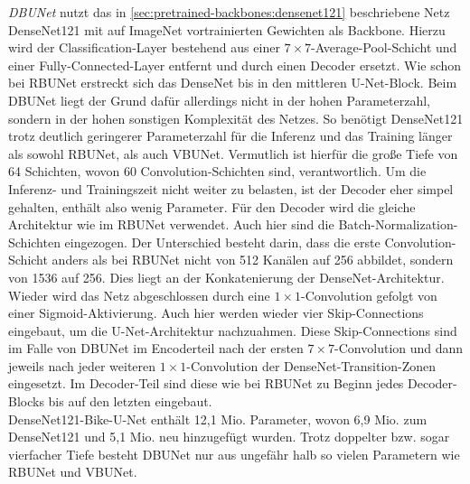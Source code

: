 \textit{\ac{DBUNet}} nutzt das in \autoref{sec:pretrained-backbones:densenet121} beschriebene Netz DenseNet121 
mit auf ImageNet vortrainierten Gewichten als Backbone.
Hierzu wird der Classification-Layer bestehend aus einer $7\times 7$-Average-Pool-Schicht 
und einer Fully-Connected-Layer entfernt und durch einen Decoder ersetzt. 
Wie schon bei \ac{RBUNet} erstreckt sich das DenseNet bis in den mittleren U-Net-Block. Beim \ac{DBUNet} 
liegt der Grund dafür allerdings nicht in der hohen Parameterzahl, sondern in der hohen sonstigen Komplexität 
des Netzes. So benötigt DenseNet121 trotz deutlich geringerer Parameterzahl für die Inferenz und das Training länger 
als sowohl \ac{RBUNet}, als auch \ac{VBUNet}. Vermutlich ist hierfür die große Tiefe von 64 Schichten, wovon 
60 Convolution-Schichten sind, verantwortlich. Um die Inferenz- und Trainingszeit nicht weiter zu belasten, 
ist der Decoder eher simpel gehalten, enthält also wenig Parameter. Für den Decoder wird die gleiche Architektur wie im \ac{RBUNet} verwendet.
Auch hier sind die Batch-Normalization-Schichten eingezogen. Der Unterschied besteht darin, 
dass die erste Convolution-Schicht anders als bei \ac{RBUNet} nicht von 512 Kanälen auf 256 abbildet, 
sondern von 1536 auf 256. Dies liegt an der Konkatenierung der DenseNet-Architektur. Wieder wird das 
Netz abgeschlossen durch eine $1\times 1$-Convolution gefolgt von einer Sigmoid-Aktivierung. 
Auch hier werden wieder vier Skip-Connections eingebaut, um die U-Net-Architektur nachzuahmen. 
Diese Skip-Connections sind im Falle von \ac{DBUNet} im Encoderteil nach der ersten $7 \times 7$-Convolution 
und dann jeweils nach jeder weiteren $1\times 1$-Convolution der DenseNet-Transition-Zonen eingesetzt. 
Im Decoder-Teil sind diese wie bei \ac{RBUNet} zu Beginn jedes Decoder-Blocks bis auf den letzten eingebaut. \\
DenseNet121-Bike-U-Net enthält 12,1 Mio. Parameter, wovon 6,9 Mio. zum DenseNet121 und 5,1 Mio. neu hinzugefügt 
wurden. Trotz doppelter bzw. sogar vierfacher Tiefe besteht \ac{DBUNet} nur aus ungefähr halb so vielen 
Parametern wie \ac{RBUNet} und \ac{VBUNet}. 




